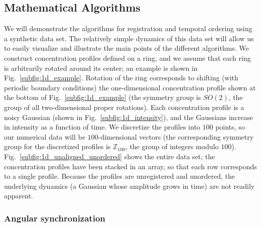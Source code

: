 \documentclass{pnastwo}
\newcommand{\fig}[0]{Fig.}
\begin{document}
\begin{article}
\subsection{Mathematical Algorithms}

We will demonstrate the algorithms for registration and temporal ordering using a synthetic data set.
%
The relatively simple dynamics of this data set will allow us to easily visualize and illustrate the main points of the different algorithms.
%
We construct concentration profiles defined on a ring, and we assume that each ring is arbitrarily rotated around its center; an example is shown in \fig~\ref{subfig:1d_example}.
%
Rotation of the ring corresponds to shifting (with periodic boundary conditions) the one-dimensional concentration profile shown at the bottom of \fig~\ref{subfig:1d_example} (the symmetry group is $SO(2)$, the group of all two-dimensional proper rotations).
%
Each concentration profile is a noisy Gaussian (shown in \fig~\ref{subfig:1d_intensity}), and the Gaussians increase in intensity as  a function of time.
%
We discretize the profiles into $100$ points, so our numerical data will be $100$-dimensional vectors (the corresponding symmetry group for the discretized profiles is $\mathbb{Z}_{100}$, the group of integers modulo $100$).
%
\fig~\ref{subfig:1d_unaligned_unordered} shows the entire data set; the concentration profiles have been stacked in an array, so that each row corresponds to a single profile.
%
Because the profiles are unregistered and unordered, the underlying dynamics (a Gaussian whose amplitude grows in time) are not readily apparent.



\subsubsection{Angular synchronization \cite{singer2011angular}}


\end{article}
\end{document}
